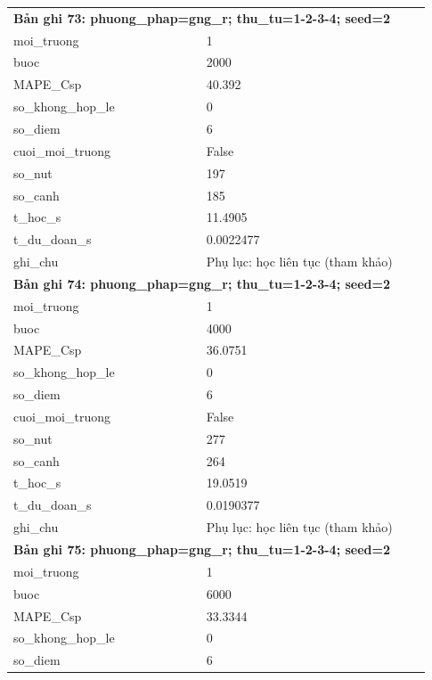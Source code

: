 \begin{longtable}{p{0.43\linewidth}p{0.50\linewidth}}
\midrule
\multicolumn{2}{p{0.95\linewidth}}{\textbf{Bản ghi 73: phuong\_phap=gng\_r; thu\_tu=1-2-3-4; seed=2}} \\
moi\_\allowbreak truong & 1 \\
buoc & 2000 \\
MAPE\_\allowbreak Csp & 40.392 \\
so\_\allowbreak khong\_\allowbreak hop\_\allowbreak le & 0 \\
so\_\allowbreak diem & 6 \\
cuoi\_\allowbreak moi\_\allowbreak truong & False \\
so\_\allowbreak nut & 197 \\
so\_\allowbreak canh & 185 \\
t\_\allowbreak hoc\_\allowbreak s & 11.4905 \\
t\_\allowbreak du\_\allowbreak doan\_\allowbreak s & 0.0022477 \\
ghi\_\allowbreak chu & Phụ lục: học liên tục (tham khảo) \\
\midrule
\multicolumn{2}{p{0.95\linewidth}}{\textbf{Bản ghi 74: phuong\_phap=gng\_r; thu\_tu=1-2-3-4; seed=2}} \\
moi\_\allowbreak truong & 1 \\
buoc & 4000 \\
MAPE\_\allowbreak Csp & 36.0751 \\
so\_\allowbreak khong\_\allowbreak hop\_\allowbreak le & 0 \\
so\_\allowbreak diem & 6 \\
cuoi\_\allowbreak moi\_\allowbreak truong & False \\
so\_\allowbreak nut & 277 \\
so\_\allowbreak canh & 264 \\
t\_\allowbreak hoc\_\allowbreak s & 19.0519 \\
t\_\allowbreak du\_\allowbreak doan\_\allowbreak s & 0.0190377 \\
ghi\_\allowbreak chu & Phụ lục: học liên tục (tham khảo) \\
\midrule
\multicolumn{2}{p{0.95\linewidth}}{\textbf{Bản ghi 75: phuong\_phap=gng\_r; thu\_tu=1-2-3-4; seed=2}} \\
moi\_\allowbreak truong & 1 \\
buoc & 6000 \\
MAPE\_\allowbreak Csp & 33.3344 \\
so\_\allowbreak khong\_\allowbreak hop\_\allowbreak le & 0 \\
so\_\allowbreak diem & 6 \\

\end{longtable}
